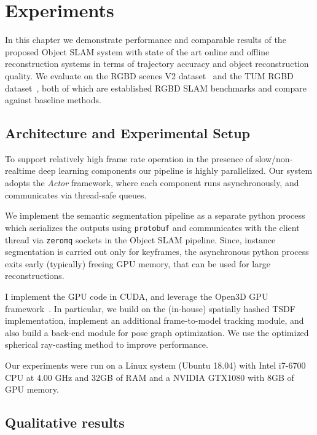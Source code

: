 \chapter{Experiments}

In this chapter we demonstrate performance and comparable results of the proposed Object SLAM system with state of the art online and offline reconstruction systems in terms of trajectory accuracy and object reconstruction quality. We evaluate on the RGBD scenes V2 dataset~\cite{laiUnsupervisedFeatureLearning2014} and the TUM RGBD dataset~\cite{sturmBenchmarkEvaluationRGBD2012}, both of which are established RGBD SLAM benchmarks and compare against baseline methods.

\section{Architecture and Experimental Setup}


To support relatively high frame rate operation in the presence of slow/non-realtime deep learning components our pipeline is highly parallelized. Our system adopts the \textit{Actor} framework, where each component runs asynchronously, and communicates via thread-safe queues.

We implement the semantic segmentation pipeline as a separate python process which serializes the outputs using \texttt{protobuf} and communicates with the client thread via \texttt{zeromq} sockets in the Object SLAM pipeline. Since, instance segmentation is carried out only for keyframes, the asynchronous python process exits early (typically) freeing GPU memory, that can be used for large reconstructions.

I implement the GPU code in CUDA, and leverage the Open3D GPU framework~\cite{dongGPUAcceleratedRobust2019}. In particular, we build on the (in-house) spatially hashed TSDF implementation, implement an additional frame-to-model tracking module, and also build a back-end module for pose graph optimization. We use the optimized spherical ray-casting method to improve performance.

Our experiments were run on a Linux system (Ubuntu 18.04) with Intel i7-6700 CPU at 4.00 GHz and 32GB of RAM and a NVIDIA GTX1080 with 8GB of GPU memory.

\section{Qualitative results}


